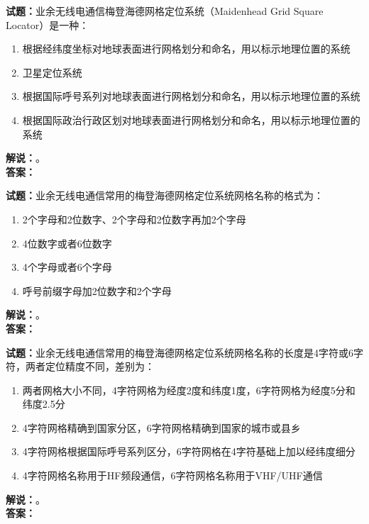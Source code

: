 \documentclass{ctexbook}
\begin{document}
\bigskip




\noindent\textbf{试题：}业余无线电通信梅登海德网格定位系统（Maidenhead Grid Square Locator）是一种：
\begin{enumerate}[leftmargin=3em]
\item 根据经纬度坐标对地球表面进行网格划分和命名，用以标示地理位置的系统
\item 卫星定位系统
\item 根据国际呼号系列对地球表面进行网格划分和命名，用以标示地理位置的系统
\item 根据国际政治行政区划对地球表面进行网格划分和命名，用以标示地理位置的系统
\end{enumerate}
\noindent\textbf{解说：}\textbf{}。\\\noindent\textbf{答案：}

\bigskip




\noindent\textbf{试题：}业余无线电通信常用的梅登海德网格定位系统网格名称的格式为：
\begin{enumerate}[leftmargin=3em]
\item 2个字母和2位数字、2个字母和2位数字再加2个字母
\item 4位数字或者6位数字
\item 4个字母或者6个字母
\item 呼号前缀字母加2位数字和2个字母
\end{enumerate}
\noindent\textbf{解说：}\textbf{}。\\\noindent\textbf{答案：}

\bigskip




\noindent\textbf{试题：}业余无线电通信常用的梅登海德网格定位系统网格名称的长度是4字符或6字符，两者定位精度不同，差别为：
\begin{enumerate}[leftmargin=3em]
\item 两者网格大小不同，4字符网格为经度2度和纬度1度，6字符网格为经度5分和纬度2.5分
\item 4字符网格精确到国家分区，6字符网格精确到国家的城市或县乡
\item 4字符网格根据国际呼号系列区分，6字符网格在4字符基础上加以经纬度细分
\item 4字符网格名称用于HF频段通信，6字符网格名称用于VHF/UHF通信
\end{enumerate}
\noindent\textbf{解说：}\textbf{}。\\\noindent\textbf{答案：}

\bigskip
\end{document}
